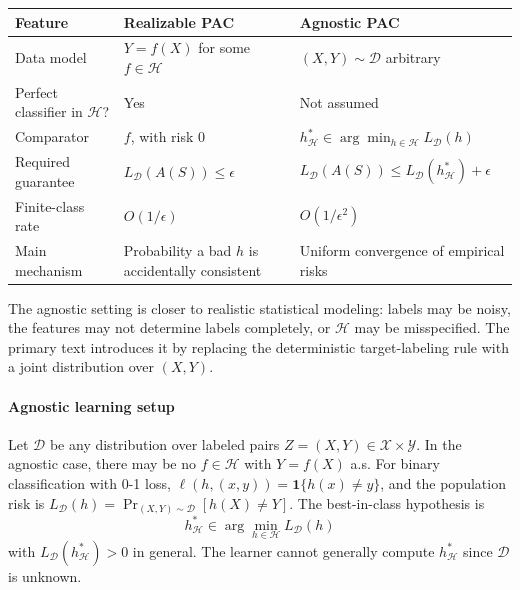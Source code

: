 \documentclass[11pt,a4paper]{article}
\theoremstyle{definition}
\begin{document}
{\footnotesize
\setlength{\tabcolsep}{3pt}
\renewcommand{\arraystretch}{1.2}
\noindent
\begin{tabularx}{\linewidth}{|
  >{\raggedright\arraybackslash}p{2.8cm}|
  >{\raggedright\arraybackslash}X|
  >{\raggedright\arraybackslash}X|
}
\hline
\textbf{Feature} & \textbf{Realizable PAC} & \textbf{Agnostic PAC} \\
\hline
Data model & $Y = f(X)$ for some $f \in \mathcal{H}$ & $(X, Y) \sim \mathcal{D}$ arbitrary \\
\hline
Perfect classifier in $\mathcal{H}$? & Yes & Not assumed \\
\hline
Comparator & $f$, with risk $0$ & $h_{\mathcal{H}}^* \in \arg \min_{h \in \mathcal{H}} L_{\mathcal{D}}(h)$ \\
\hline
Required guarantee & $L_{\mathcal{D}}(A(S)) \leq \epsilon$ & $L_{\mathcal{D}}(A(S)) \leq L_{\mathcal{D}}(h_{\mathcal{H}}^*) + \epsilon$ \\
\hline
Finite-class rate & $O(1/\epsilon)$ & $O(1/\epsilon^2)$ \\
\hline
Main mechanism & Probability a bad $h$ is accidentally consistent & Uniform convergence of empirical risks \\
\hline
\end{tabularx}
}

The agnostic setting is closer to realistic statistical modeling: labels may be noisy, the features may not determine labels completely, or $\mathcal{H}$ may be misspecified. The primary text introduces it by replacing the deterministic target-labeling rule with a joint distribution over $(X, Y)$.


\paragraph{Agnostic learning setup}
Let $\mathcal{D}$ be any distribution over labeled pairs $Z = (X, Y) \in \mathcal{X} \times \mathcal{Y}$. In the agnostic case, there may be no $f \in \mathcal{H}$ with $Y = f(X)$ a.s. For binary classification with 0-1 loss, $\ell(h, (x, y)) = \mathbf{1}\{h(x) \neq y\}$, and the population risk is $L_{\mathcal{D}}(h) = \Pr_{(X,Y) \sim \mathcal{D}}[h(X) \neq Y]$. The best-in-class hypothesis is
\[
h_{\mathcal{H}}^* \in \arg\min_{h \in \mathcal{H}} L_{\mathcal{D}}(h)
\]
with $L_{\mathcal{D}}(h_{\mathcal{H}}^*) > 0$ in general. The learner cannot generally compute $h_{\mathcal{H}}^*$ since $\mathcal{D}$ is unknown.
\end{document}
